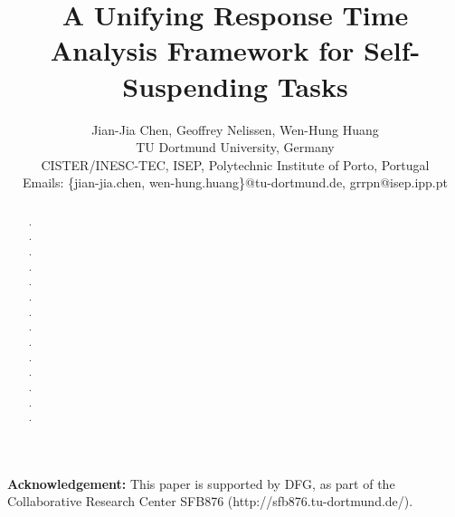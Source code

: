 \documentclass[conference]{IEEEtran}
\begin{document}
  
\title{A Unifying Response Time Analysis Framework for Self-Suspending Tasks}

\author{Jian-Jia Chen, Geoffrey Nelissen, Wen-Hung Huang\\
 TU Dortmund University, Germany\\
 CISTER/INESC-TEC, ISEP, Polytechnic Institute of Porto, Portugal \\
Emails: \{jian-jia.chen, wen-hung.huang\}@tu-dortmund.de, grrpn@isep.ipp.pt
}

\maketitle

\begin{abstract}
. \\
. \\
. \\
. \\
. \\
. \\
. \\
. \\
. \\
. \\
. \\
. \\
. \\
. 


\end{abstract}



































{\bf Acknowledgement:} This paper is supported by DFG, as part of the Collaborative Research Center SFB876 (http://sfb876.tu-dortmund.de/).

{}
\end{document}
